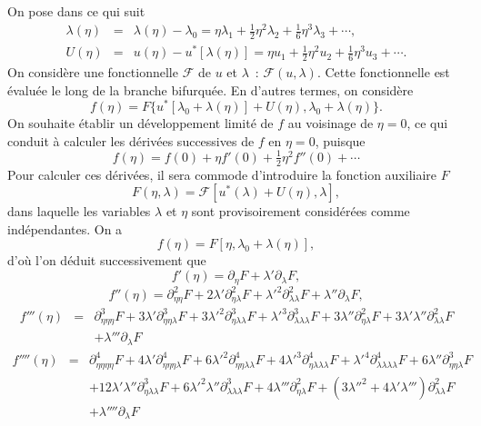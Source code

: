 \documentclass{article}
\begin{document}
On pose dans ce qui suit
\begin{eqnarray}
  λ (η) & = & λ (η) - λ_0 = η λ_1 +
  \tfrac{1}{2} η^2 λ_2 + \tfrac{1}{6} η^3 λ_3 + \cdots,
  \label{eq20211112155446}\\
  U (η) & = & u (η) - u^{\ast} [λ (η)] = η u_1 +
  \tfrac{1}{2} η^2 u_2 + \tfrac{1}{6} η^3 u_3 + \cdots .
  \label{eq20211112113028}
\end{eqnarray}
On considère une fonctionnelle $\mathcal{F}$ de $u$ et $λ$~:
$\mathcal{F} (u, λ)$. Cette fonctionnelle est évaluée le long de
la branche bifurquée. En d'autres termes, on considère
\begin{equation}
  f (η) = F \{ u^{\ast} [λ_0 + λ (η)] + U (η), λ_0
  + λ (η) \} .
\end{equation}
On souhaite établir un développement limité de $f$ au voisinage de
$η = 0$, ce qui conduit à calculer les dérivées successives de
$f$ en $η = 0$, puisque
\begin{equation}
  f (η) = f (0) + η f' (0) + \tfrac{1}{2} η^2 f'' (0) + \cdots
\end{equation}
Pour calculer ces dérivées, il sera commode d'introduire la fonction
auxiliaire $F$
\begin{equation}
  F (η, λ) =\mathcal{F} [u^{\ast} (λ) + U (η), λ],
\end{equation}
dans laquelle les variables $λ$ et $η$ sont provisoirement
considérées comme indépendantes. On a
\begin{equation}
  f (η) = F [η, λ_0 + λ (η)],
\end{equation}
d'où l'on déduit successivement que
\begin{equation}
  \label{eq20211112162417} f' (η) = \partial_{η} F + λ'
  \partial_{λ} F,
\end{equation}
\begin{equation}
  \label{eq20211112165810} f'' (η) = \partial_{η  η}^2 F + 2
  λ' \partial_{η  λ}^2 {F + λ'}^2
  \partial_{λ  λ}^2 F + λ'' \partial_{λ} F,
\end{equation}
\begin{eqnarray}
  \label{eq20211112173223} f''' (η) & = & \partial_{η  η
   η}^3 F + 3 λ' \partial_{η  η
  λ}^3 {F + 3 λ'}^2 \partial_{η  λ
  λ}^3 {F + λ'}^3 \partial_{λ  λ
  λ}^3 F + 3 λ'' \partial_{η  λ}^2 F + 3 λ'
  λ'' \partial_{λ  λ}^2 F \nonumber\\
  &  &  + λ''' \partial_{λ} F
\end{eqnarray}
\begin{eqnarray}
  f'''' (η) & = & \partial_{η  η  η
  η}^4 F + 4 λ' \partial_{η  η  η
  λ}^4 {F + 6 λ'}^2 \partial_{η  η  λ
   λ}^4 {F + 4 λ'}^3 \partial_{η  λ
   λ  λ}^4 {F + λ'}^4 \partial_{λ
   λ  λ  λ}^4 F + 6 λ''
  \partial_{η  η  λ}^3 F \nonumber\\
  &  & + 12 λ' λ'' \partial_{η  λ
  λ}^3 {F + 6 λ'}^2 λ'' \partial_{λ  λ
   λ}^3 F + 4 λ''' \partial_{η  λ}^2 F +
  \left( {3 λ''}^2 + 4 λ' λ''' \right) \partial_{λ
   λ}^2 F \\
  &  & + λ'''' \partial_{λ} F
\end{eqnarray}
\end{document}
